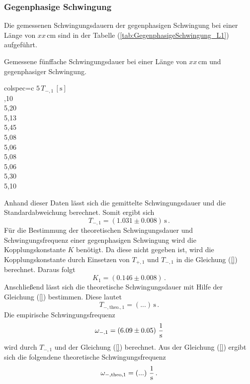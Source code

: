 \subsubsection{Gegenphasige Schwingung}
\label{sec:GegenphasigeSchwingung_KurzelPendel}
Die gemessenen Schwingungsdauern der gegenphasigen Schwingung bei einer Länge von $xx\, \unit{\centi\meter}$ sind 
in der Tabelle (\ref{tab:GegenphasigeSchwingung_L1}) aufgeführt. 
\begin{table}[H]
  \centering
  \caption{Gemessene fünffache Schwingungsdauer bei einer Länge von $xx\, \unit{\centi\meter}$ und gegenphasiger Schwingung.}
  \label{tab:GegenphasigeSchwingung_L1}
  \begin{tblr}{colspec={c}}
      \toprule
      $5\, T_{-, 1}\,\left[\unit{\second}\right]$\\
      ,10 \\
      5,20 \\
      5,13 \\
      5,45 \\
      5,08 \\
      5,06 \\
      5,08 \\
      5,06 \\
      5,30 \\
      5,10 \\
      \bottomrule
  \end{tblr}
\end{table}
Anhand dieser Daten lässt sich die gemittelte Schwingungsdauer und die Standardabweichung berechnet. Somit ergibt sich
$$T_{-, 1} = \left(1.031 \pm 0.008 \right)\, \unit{\second}\,.$$ 
Für die Bestimmung der theoretischen Schwingungsdauer und Schwingungsfrequenz einer gegenphasigen Schwingung wird die Kopplungskonstante $K$ benötigt. Da
diese nicht gegeben ist, wird die Kopplungskonstante durch Einsetzen von $T_{+,1}$ und $T_{-,1}$ in die Gleichung (\ref{}) berechnet.
Daraus folgt
$$K_1 = \left( 0.146 \pm 0.008 \right)\,.$$
Anschließend lässt sich die theoretische Schwingungsdauer mit Hilfe der Gleichung (\ref{}) bestimmen. Diese lautet
$$T_{-,\text{theo.},1} = \left( ... \right)\, \unit{\second}\,.$$
Die empirische Schwingungsfrequenz 
$$\omega_{-,1} = \left( 6.09 \pm 0.05 \right)\, \unit[per-mode=fraction]{\per \second}$$ wird durch $T_{-,1}$ und der Gleichung (\ref{})
berechnet. Aus der Gleichung (\ref{}) ergibt sich die folgendene theoretische Schwingungsfrequenz
$$\omega_{-,\text{theo},1} = \left( ... \right)\,\unit[per-mode=fraction]{\per \second}\,.$$

